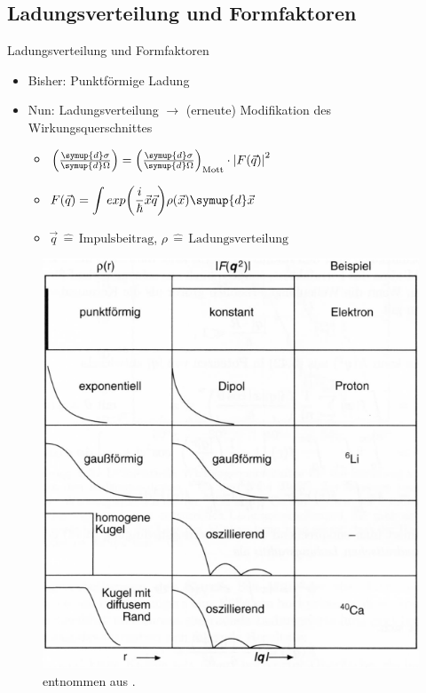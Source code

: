 \documentclass[aspectratio=1610, 9pt]{beamer}
\begin{document}
\subsection{Ladungsverteilung und Formfaktoren}
\begin{frame}{Ladungsverteilung und Formfaktoren}
\begin{itemize}
  \item{Bisher: Punktförmige Ladung}
  \item{Nun: Ladungsverteilung $\rightarrow$ (erneute) Modifikation des Wirkungsquerschnittes}
  \begin{itemize}
    \item{$\left( \frac{\symup{d} \sigma}{\symup{d} \Omega } \right) = \left( \frac{\symup{d} \sigma}{\symup{d} \Omega } \right)_\text{Mott} \cdot \left| F(\vec{q}) \right|^2 $}
    \item{$F(\vec{q}) = \displaystyle \int{ exp{\left(\frac{i}{\hbar} \vec{x} \vec{q} \right)} \rho(\vec{x}) \symup{d}\vec{x} } $}
    \item{$\vec{q} \,\hat{=} \,\text{Impulsbeitrag} $, $\rho \,\hat{=} \,\text{Ladungsverteilung} $}
  \end{itemize}
\end{itemize}

\end{frame}


\begin{frame}
\begin{figure}
  \centering
  \includegraphics[scale=0.31]{images/Form.png}
  \caption{entnommen aus \cite{KET}.}
\end{figure}
\end{frame}
\end{document}
